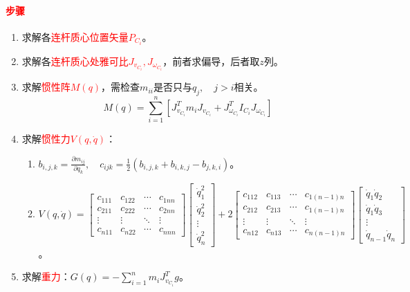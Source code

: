 \documentclass[
12pt, %
a4paper, 
oneside, %
]{scrartcl}
\begin{document}
\paragraph{\textcolor{red}{步骤}}
\begin{enumerate}
\item 求解各\textcolor{red}{连杆质心位置矢量$ P_{C_i} $}。
\item 求解各\textcolor{red}{连杆质心处雅可比$ J_{v_{C_i}}, J_{\omega_{C_i}} $}，前者求偏导，后者取$ z $列。
\item 求解\textcolor{red}{惯性阵$ M(q) $}，需检查$ m_{ii} $是否只与$ q_j, \quad j > i $相关。
$$ M(q) = \sum_{i = 1}^{n}[J_{v_{C_i}}^T m_i J_{v_{C_i}} + J_{\omega_{C_i}}^T I_{C_i} J_{\omega_{C_i}}] $$
\item 求解\textcolor{red}{惯性力$ V(q, \dot{q}) $}：
\begin{enumerate}
\item $ b_{i,j,k} = \frac{\partial m_{ij}}{\partial q_k}, \quad c_{ijk} = \frac{1}{2}(b_{i,j,k} + b_{i,k,j} - b_{j,k,i}) $。
\item 
$
V(q, \dot{q}) = 
\begin{bmatrix} c_{111} & c_{122} & \cdots & c_{1nn} \\ c_{211} & c_{222} & \cdots & c_{2nn} \\ \vdots & \vdots & \ddots & \vdots \\ c_{n11} & c_{n22} & \cdots & c_{nnn} \end{bmatrix} \begin{bmatrix} \dot{q}_1^2 \\ \dot{q}_2^2 \\ \vdots \\ \dot{q}_n^2 \end{bmatrix}
+ 2\begin{bmatrix} c_{112} & c_{113} & \cdots & c_{1(n - 1)n} \\ c_{212} & c_{213} & \cdots & c_{1(n - 1)n} \\ \vdots & \vdots & \ddots & \vdots \\ c_{n12} & c_{n13} & \cdots & c_{n(n - 1)n} \end{bmatrix} \begin{bmatrix} \dot{q}_1 \dot{q}_2 \\ \dot{q}_1 \dot{q}_3 \\ \vdots \\ \dot{q}_{n - 1} \dot{q}_n \end{bmatrix}
$。
\end{enumerate}
\item 求解\textcolor{red}{重力}：$ G(q) = -\sum_{i = 1}^{n} m_i J_{v_{C_i}}^T g $。
\end{enumerate}
\end{document}
